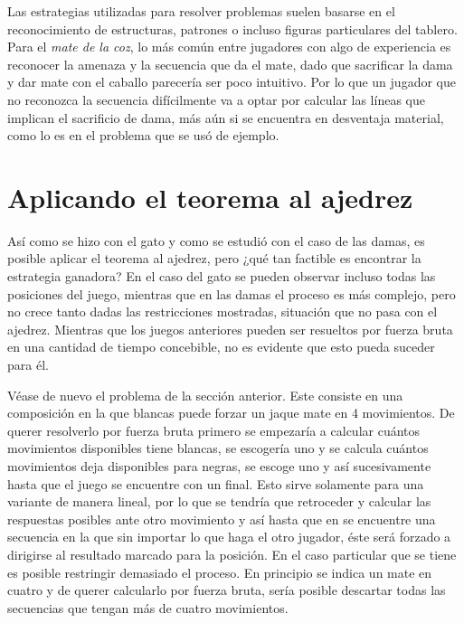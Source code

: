 \documentclass[twoside,openright,12pt,a4paper,spanish]{book}
\begin{document}
Las estrategias utilizadas para resolver problemas suelen basarse en el reconocimiento de estructuras, patrones o incluso figuras particulares del tablero. Para el \emph{mate de la coz}, lo más común entre jugadores con algo de experiencia es reconocer la amenaza y la secuencia que da el mate, dado que sacrificar la dama y dar mate con el caballo parecería ser poco intuitivo. Por lo que un jugador que no reconozca la secuencia difícilmente va a optar por calcular las líneas que implican el sacrificio de dama, más aún si se encuentra en desventaja material, como lo es en el problema que se usó de ejemplo.

\section{Aplicando el teorema al ajedrez}

\noindent Así como se hizo con el gato y como se estudió con el caso de las damas, es posible aplicar el teorema al ajedrez, pero ¿qué tan factible es encontrar la estrategia ganadora? En el caso del gato se pueden observar incluso todas las posiciones del juego, mientras que en las damas el proceso es más complejo, pero no crece tanto dadas las restricciones mostradas, situación que no pasa con el ajedrez. Mientras que los juegos anteriores pueden ser resueltos por fuerza bruta en una cantidad de tiempo concebible, no es evidente que esto pueda suceder para él.

Véase de nuevo el problema de la sección anterior. Este consiste en una composición en la que blancas puede forzar un jaque mate en 4 movimientos. De querer resolverlo por fuerza bruta primero se empezaría a calcular cuántos movimientos disponibles tiene blancas, se escogería uno y se calcula cuántos movimientos deja disponibles para negras, se escoge uno y así sucesivamente hasta que el juego se encuentre con un final. Esto sirve solamente para una variante de manera lineal, por lo que se tendría que retroceder y calcular las respuestas posibles ante otro movimiento y así hasta que en se encuentre una secuencia en la que sin importar lo que haga el otro jugador, éste será forzado a dirigirse al resultado marcado para la posición. En el caso particular que se tiene es posible restringir demasiado el proceso. En principio se indica un mate en cuatro y de querer calcularlo por fuerza bruta, sería posible descartar todas las secuencias que tengan más de cuatro movimientos.
\end{document}
